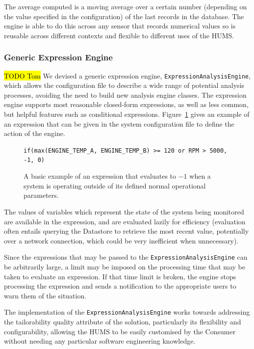 \documentclass[10pt,a4paper]{article}
\begin{document}
The average computed is a moving average over a certain number (depending on the value specified in the configuration) of the last records in the database. The engine is able to do this across any sensor that records numerical values so is reusable across different contexts and flexible to different uses of the HUMS.

\subsubsection{Generic Expression Engine}
\hl{TODO Tom}
We devised a generic expression engine, \texttt{ExpressionAnalysisEngine}, which allows the configuration file to describe a wide range of potential analysis processes, avoiding the need to build new analysis engine classes. The expression engine supports most reasonable closed-form expressions, as well as less common, but helpful features such as conditional expressions. Figure~\ref{fig:exprExample} gives an example of an expression that can be given in the system configuration file to define the action of the engine.
\begin{figure}[htbp]
\centering
\verb+if(max(ENGINE_TEMP_A, ENGINE_TEMP_B) >= 120 or RPM > 5000, -1, 0)+
\caption{A basic example of an expression that evaluates to $-1$ when a system is operating outside of its defined normal operational parameters.}
\label{fig:exprExample}
\end{figure}

The values of variables which represent the state of the system being monitored are available in the expression, and are evaluated lazily for efficiency (evaluation often entails querying the Datastore to retrieve the most recent value, potentially over a network connection, which could be very inefficient when unnecessary).

Since the expressions that may be passed to the \texttt{ExpressionAnalysisEngine} can be arbitrarily large, a limit may be imposed on the processing time that may be taken to evaluate an expression. If that time limit is broken, the engine stops processing the expression and sends a notification to the appropriate users to warn them of the situation.

The implementation of the \texttt{ExpressionAnalysisEngine} works towards addressing the tailorability quality attribute of the solution, particularly its flexibility and configurability, allowing the HUMS to be easily customised by the Consumer without needing any particular software engineering knowledge. %
\end{document}
